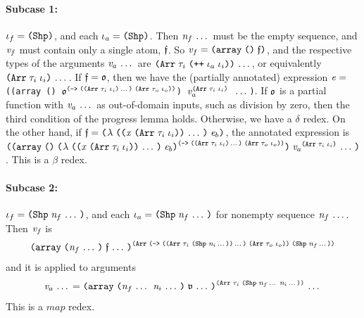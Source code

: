 \begin{sproof}
  \paragraph{Subcase 1:} $\idx_f = \idxshape{}$, and each $\idx_a = \idxshape{}$.
  Then $\mathit{n}_f \, \ldots \,$ must be the empty sequence,
  and $\mathit{v}_f$ must contain only a single atom, $\mathfrak{f}$.
  So $\val_f = \arrlit{\func}{}$,
  and the respective types of the arguments $\mathit{v}_a \, \ldots \,$ are
  $\sequence{\typearray{\type_i}{\idxappend{\idx_a \; \idx_i}}}$,
  or equivalently $\sequence{\typearray{\type_i}{\idx_i}}$.
  If $\mathfrak{f} = \mathfrak{o}$,
  then we have the (partially annotated) expression
  $\mathit{e} =$
  {\tt ((array () $\primop^{\typefun
      {\sequence{\typearray{\type_i}{\idx_i}}}
      {\typearray{\type_o}{\idx_o}}}$)
    $\val_a^{\typearray{\type_i}{\idx_i}}$
    $\, \ldots \,$)}.
  If $\mathfrak{o}$ is a partial function
  with $\mathit{v}_a \, \ldots \,$ as out-of-domain inputs,
  such as division by zero,
  then the third condition of the progress lemma holds.
  Otherwise, we have a $\delta$ redex.
  On the other hand, if
  $\func = \lam{\sequence{\notevar{\var}{\typearray{\type_i}{\idx_i}}}}{\expr_b}$,
  the annotated expression is
  $\app
  {\arrlit
    {\annotate
      [\typefun
      {\sequence{\typearray{\type_i}{\idx_i}}}
      {\typearray{\type_o}{\idx_o}}]
      {\lam{\sequence{\notevar{\var}{\typearray{\type_i}{\idx_i}}}}{\expr_b}}}{}}
  {\sequence{\annotate[\typearray{\type_i}{\idx_i}]{\val_a}}}$.
  This is a $\beta$ redex.%
  \paragraph{Subcase 2:}
  $\idx_f = \idxshape{\sequence{\nat_f}}$,
  and each $\idx_a = \idxshape{\sequence{\nat_f}}$
  for nonempty sequence $\mathit{n}_f \, \ldots \,$.
  Then $\mathit{v}_f$ is
  $${\annotate
    [\typearray
    {\typefun
      {\sequence{\typearray{\type_i}{\idxshape{\sequence{\nat_i}}}}}
      {\typearray{\type_o}{\idx_o}}}
    {\idxshape{\sequence{\nat_f}}}]
    {\arrlit{\sequence{\func}}{\sequence{\nat_f}}}}$$
  and it is applied to arguments
  $$\sequence{\val_a} =
  \sequence{\annotate
    [\typearray{\type_i}{\idxshape{\sequence{\nat_f} \; \sequence{\nat_i}}}]
    {\arrlit{\sequence{\atval}}{\sequence{\nat_f} \; \sequence{\nat_i}}}}$$
  This is a $\mathit{map}$ redex.%

\end{sproof}
